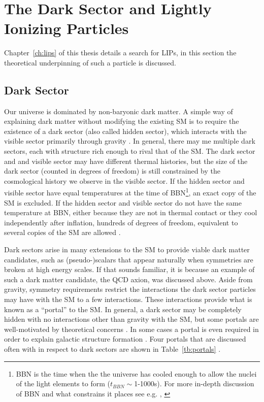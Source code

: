 \section{The Dark Sector and Lightly Ionizing Particles}
Chapter~\ref{ch:lips} of this thesis details a search for \ac{LIP}s, in this section the theoretical underpinning of such a particle is discussed. 

\subsection{Dark Sector}
Our universe is dominated by non-baryonic dark matter. A simple way of explaining dark matter without modifying the existing \ac{SM} is to require the existence of a dark sector (also called hidden sector), which interacts with the visible sector primarily through gravity \cite{Foot2014}. In general, there may me multiple dark sectors, each with structure rich enough to rival that of the \ac{SM}. The dark sector and and visible sector may have different thermal histories, but the size of the dark sector (counted in degrees of freedom) is still constrained by the cosmological history we observe in the visible sector. If the hidden sector and visible sector have equal temperatures at the time of \ac{BBN}\footnote{\ac{BBN} is the time when the the universe has cooled enough to allow the nuclei of the light elements to form ($t_{BBN}\sim$1-1000s). For more in-depth discussion of \ac{BBN} and what constrains it places see e.g. \cite{Ryden2006}, \cite{Kolb1990}}, an exact copy of the \ac{SM} is excluded. If the hidden sector and visible sector do not have the same temperature at \ac{BBN}, either because they are not in thermal contact or they cool independently after inflation, hundreds of degrees of freedom, equivalent to several copies of the \ac{SM} are allowed \cite{Feng2010}.

Dark sectors arise in many extensions to the \ac{SM} to provide viable dark matter candidates, such as (pseudo-)scalars that appear naturally when symmetries are broken at high energy scales. If that sounds familiar, it is because an example of such a dark matter candidate, the QCD axion, was discussed above. Aside from gravity, symmetry requirements restrict the interactions the dark sector particles may have with the \ac{SM} to a few interactions. These interactions provide what is known as a ``portal'' to the \ac{SM}. In general, a dark sector may be completely hidden with no interactions other than gravity with the \ac{SM}, but some portals are well-motivated by theoretical concerns \cite{Essig2013} \cite{Feng2010}. In some cases a portal is even required in order to explain galactic structure formation \cite{Foot2014}. Four portals that are discussed often with in respect to dark sectors are shown in Table~\ref{tb:portals} \cite{Essig2013}.

